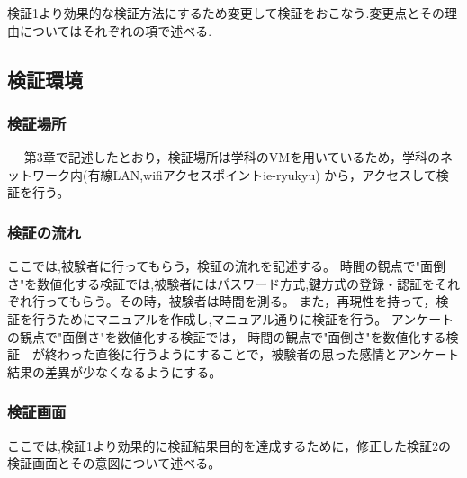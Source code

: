     検証1より効果的な検証方法にするため変更して検証をおこなう.変更点とその理由についてはそれぞれの項で述べる.

  \newpage

  \subsection{検証環境} 
    \subsubsection{検証場所}%
    　  第3章で記述したとおり，検証場所は学科のVMを用いているため，学科のネットワーク内(有線LAN,wifiアクセスポイント{ie-ryukyu})
        から，アクセスして検証を行う。
    \subsubsection{検証の流れ}%
        ここでは,被験者に行ってもらう，検証の流れを記述する。
        時間の観点で"面倒さ"を数値化する検証では,被験者にはパスワード方式,鍵方式の登録・認証をそれぞれ行ってもらう。その時，被験者は時間を測る。 
        また，再現性を持って，検証を行うためにマニュアルを作成し,マニュアル通りに検証を行う。
        アンケートの観点で"面倒さ"を数値化する検証では，
        時間の観点で"面倒さ"を数値化する検証　が終わった直後に行うようにすることで，被験者の思った感情とアンケート結果の差異が少なくなるようにする。


    \newpage

    \subsubsection{検証画面}

    ここでは,検証1より効果的に検証結果目的を達成するために，修正した検証2の検証画面とその意図について述べる。


